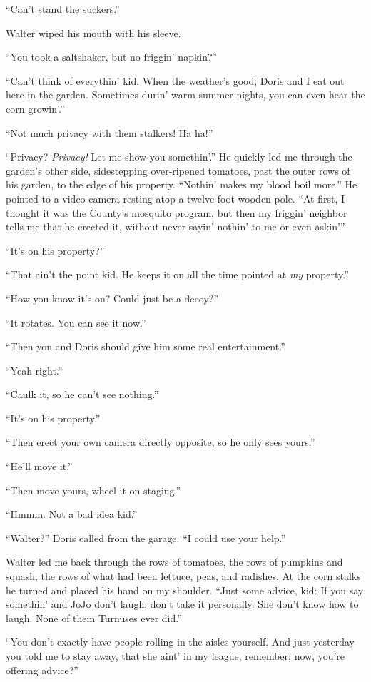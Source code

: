 ``Can't stand the suckers.''

Walter wiped his mouth with his sleeve.

``You took a saltshaker, but no friggin' napkin?''

``Can't think of everythin' kid. When the weather's good, Doris and I
eat out here in the garden. Sometimes durin' warm summer nights, you can
even hear the corn growin'.''

``Not much privacy with them stalkers! Ha ha!''

``Privacy? \emph{Privacy!} Let me show you somethin'.'' He quickly led
me through the garden's other side, sidestepping over-ripened tomatoes,
past the outer rows of his garden, to the edge of his property.
``Nothin' makes my blood boil more.'' He pointed to a video camera
resting atop a twelve-foot wooden pole. ``At first, I thought it was the
County's mosquito program, but then my friggin' neighbor tells me that
he erected it, without never sayin' nothin' to me or even askin'.''

``It's on his property?''

``That ain't the point kid. He keeps it on all the time pointed at
\emph{my} property.''

``How you know it's on? Could just be a decoy?''

``It rotates. You can see it now.''

``Then you and Doris should give him some real entertainment.''

``Yeah right.''

``Caulk it, so he can't see nothing.''

``It's on his property.''

``Then erect your own camera directly opposite, so he only sees yours.''

``He'll move it.''

``Then move yours, wheel it on staging.''

``Hmmm. Not a bad idea kid.''

``Walter?'' Doris called from the garage. ``I could use your help.''

Walter led me back through the rows of tomatoes, the rows of pumpkins
and squash, the rows of what had been lettuce, peas, and radishes. At
the corn stalks he turned and placed his hand on my shoulder. ``Just
some advice, kid: If you say somethin' and JoJo don't laugh, don't take
it personally. She don't know how to laugh. None of them Turnuses ever
did.''

``You don't exactly have people rolling in the aisles yourself. And just
yesterday you told me to stay away, that she aint' in my league,
remember; now, you're offering advice?''

